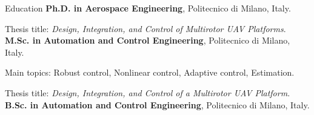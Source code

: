 \begin{rubric}{Education}
%
\entry*[11/16 -- 01/20]%
	\textbf{Ph.D. in Aerospace Engineering}, Politecnico di Milano, Italy.
	\par Thesis title: \emph{Design, Integration, and Control of Multirotor UAV Platforms}.
%
\entry*[10/13 -- 12/15]%
	\textbf{M.Sc. in Automation and Control Engineering}, Politecnico di Milano, Italy.\par
    Main topics: Robust control, Nonlinear control, Adaptive control, Estimation.\par
	Thesis title: \emph{Design, Integration, and Control of a Multirotor UAV Platform}.
% 
\entry*[09/10 -- 10/13]%
	\textbf{B.Sc. in Automation and Control Engineering}, Politecnico di Milano, Italy.
%
\end{rubric}
